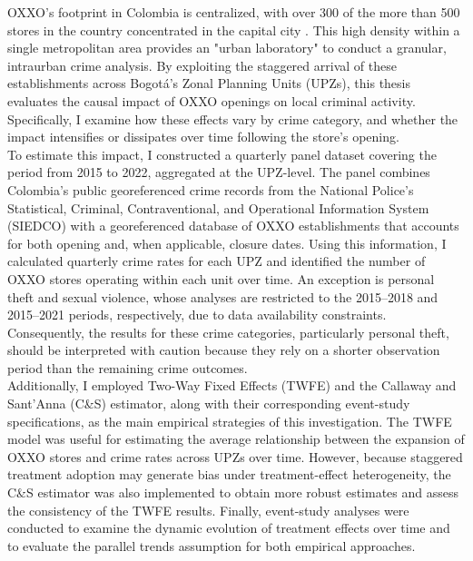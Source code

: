 \documentclass[12pt]{article}
\begin{document}
OXXO’s footprint in Colombia is centralized, with over 300 of the more than 500 stores in the country concentrated in the capital city \parencite{godoy2025}. This high density within a single metropolitan area provides an "urban laboratory" to conduct a granular, intraurban crime analysis. By exploiting the staggered arrival of these establishments across Bogotá’s Zonal Planning Units (UPZs), this thesis evaluates the causal impact of OXXO openings on local criminal activity. Specifically, I examine how these effects vary by crime category, and whether the impact intensifies or dissipates over time following the store's opening.\\

To estimate this impact, I constructed a quarterly panel dataset covering the period from 2015 to 2022, aggregated at the UPZ-level. The panel combines Colombia’s public georeferenced crime records from the National Police’s Statistical, Criminal, Contraventional, and Operational Information System (SIEDCO) with a georeferenced database of OXXO establishments that accounts for both opening and, when applicable, closure dates. Using this information, I calculated quarterly crime rates for each UPZ and identified the number of OXXO stores operating within each unit over time. An exception is personal theft and sexual violence, whose analyses are restricted to the 2015–2018 and 2015–2021 periods, respectively, due to data availability constraints. Consequently, the results for these crime categories, particularly personal theft, should be interpreted with caution because they rely on a shorter observation period than the remaining crime outcomes.\\

Additionally, I employed Two-Way Fixed Effects (TWFE) and the Callaway and Sant’Anna (C\&S) estimator, along with their corresponding event-study specifications, as the main empirical strategies of this investigation. The TWFE model was useful for estimating the average relationship between the expansion of OXXO stores and crime rates across UPZs over time. However, because staggered treatment adoption may generate bias under treatment-effect heterogeneity, the C\&S estimator was also implemented to obtain more robust estimates and assess the consistency of the TWFE results. Finally, event-study analyses were conducted to examine the dynamic evolution of treatment effects over time and to evaluate the parallel trends assumption for both empirical approaches.\\
\end{document}
